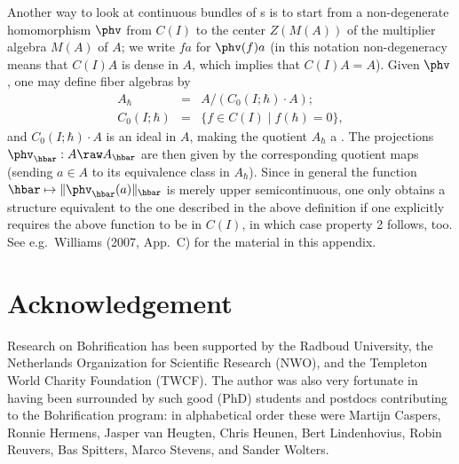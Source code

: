 \documentclass[12pt]{article}
\begin{document}
Another way to look at continuous bundles of \ca s is to start from a non-degenerate homomorphism $\phv$ from $C(I)$ to the center $Z(M(A))$ of the multiplier algebra $M(A)$ of $A$; we  write  $fa$ for $\phv(f)a$ (in this notation non-degeneracy means that $C(I)A$ is dense in $A$, which implies
 that $C(I)A=A$).
 Given $\phv$,  one may define  fiber algebras by 
 \begin{eqnarray}
 A_{\hbar}&=&A/(C_0(I;\hbar)\cdot A);\\
 C_0(I;\hbar)&=&\{f\in C(I)\mid f(\hbar)=0\},
\end{eqnarray}
 and $C_0(I;\hbar)\cdot A$ is an ideal in $A$, making the quotient $ A_{\hbar}$ a \ca. 
The projections $\phv_{\hbar}:A\raw A_{\hbar}$ are then given by the corresponding quotient maps (sending $a\in A$ to its equivalence class in $A_{\hbar}$). Since in general the function 
  ${\hbar}\mapsto  \|\phv_{\hbar}(a)\|_{\hbar}$  is merely upper semicontinuous, one only obtains a structure  equivalent to the one described in the above definition if one explicitly requires the above function to be in $C(I)$, in which case 
  property 2 follows, too. See e.g.\ Williams (2007, App.\ C) for the material in this appendix. 
\section*{Acknowledgement}  
Research on Bohrification has been  supported by the Radboud University, the Netherlands Organization for Scientific Research (NWO), and the Templeton World Charity Foundation (TWCF).
The author was also very fortunate in having been surrounded by such good (PhD) students  and postdocs contributing to the Bohrification program: in alphabetical order these were
Martijn Caspers, Ronnie Hermens, Jasper van Heugten, Chris Heunen, Bert Lindenhovius, Robin Reuvers, Bas Spitters, Marco Stevens, and Sander Wolters. 
\end{document}
